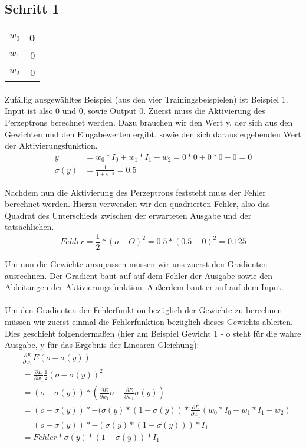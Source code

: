 \documentclass[a4paper]{article}
\begin{document}
\subsection{Schritt 1}
\begin{tabular}{|l|r|}
	\hline
	$w_0$ & 0 \\\hline
	$w_1$ & 0 \\\hline
	$w_2$ & 0 \\\hline
\end{tabular}
\paragraph{}
Zufällig ausgewähltes Beispiel (aus den vier Trainingsbeispielen) ist Beispiel 1. Input ist also 0 und 0, sowie Output 0.
Zuerst muss die Aktivierung des Perzeptrons berechnet werden. Dazu brauchen wir den Wert y, der sich aus den Gewichten und den Eingabewerten ergibt, sowie den sich daraus ergebenden Wert der Aktivierungsfunktion.
\begin{align*}
	y &= w_0 * I_0 + w_1 * I_1 - w_2 = 0 * 0 + 0 * 0 - 0 = 0 \\
	\sigma(y) &= \frac{1}{1 + e^{-y}} = 0.5
\end{align*}

Nachdem nun die Aktivierung des Perzeptrons feststeht muss der Fehler berechnet werden. Hierzu verwenden wir den quadrierten Fehler, also das Quadrat des Unterschieds zwischen der erwarteten Ausgabe und der tatsächlichen.
\[
	Fehler = \frac{1}{2} * (o - O)^2 = 0.5 * (0.5 - 0)^2 = 0.125
\]

Um nun die Gewichte anzupassen müssen wir uns zuerst den Gradienten ausrechnen.
Der Gradient baut auf auf dem Fehler der Ausgabe sowie den Ableitungen der Aktivierungsfunktion. Außerdem baut er auf auf dem Input.
\paragraph{}
Um den Gradienten der Fehlerfunktion bezüglich der Gewichte zu berechnen müssen wir zuerst einmal die Fehlerfunktion bezüglich dieses Gewichts ableiten. Dies geschieht folgendermaßen (hier am Beispiel Gewicht 1 - o steht für die wahre Ausgabe, y für das Ergebnis der Linearen Gleichung):
\begin{align*}
	&\frac{\partial E}{\partial w_1} E(o - \sigma(y)) \\ 
	&= \frac{\partial E}{\partial w_1} \frac{1}{2}(o - \sigma(y))^2 \\
	&= (o - \sigma(y)) * (\frac{\partial E}{\partial w_1}o - \frac{\partial E}{\partial w_1}\sigma(y)) \\
	&= (o - \sigma(y)) * -(\sigma(y) * (1 - \sigma(y)) * \frac{\partial E}{\partial w_1}(w_0*I_0 + w_1*I_1-w_2) \\
	&= (o - \sigma(y)) * -(\sigma(y) * (1 - \sigma(y))) * I_1 \\
	&= Fehler * \sigma(y) * (1 - \sigma(y)) * I_1 
\end{align*}
\end{document}
